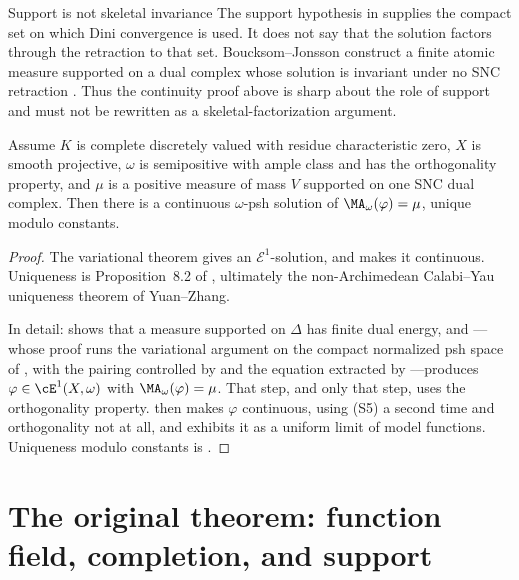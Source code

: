 \begin{warning}{Support is not skeletal invariance}
\label{warn:ch29-support-not-skeletal}
The support hypothesis in  supplies the
compact set on which Dini convergence is used.  It does not say that the
solution factors through the retraction to that set.  Boucksom--Jonsson
construct a finite atomic measure supported on a dual complex whose solution
is invariant under no SNC retraction \cite[Theorem~B]{BJGreen24}.  Thus the
continuity proof above is sharp about the role of support and must not be
rewritten as a skeletal-factorization argument.
\end{warning}

\begin{corollary}\label{cor:bfj-original-continuous-solution}
Assume \(K\) is complete discretely valued with residue characteristic zero,
\(X\) is smooth projective, \(\omega\) is semipositive with ample class and
has the orthogonality property, and \(\mu\) is a positive measure of mass
\(V\) supported on one SNC dual complex.  Then there is a continuous
\(\omega\)-psh solution of \(\MA_\omega(\varphi)=\mu\), unique modulo
constants.
\end{corollary}

\begin{proof}
The variational theorem gives an \(\mathcal E^1\)-solution, and
 makes it continuous.  Uniqueness
is Proposition~8.2 of \cite{BFJ15}, ultimately the non-Archimedean
Calabi--Yau uniqueness theorem of Yuan--Zhang.

In detail:  shows that a measure
supported on \(\Delta\) has finite dual energy, and
---whose proof runs the variational argument on
the compact normalized psh space of
, with the pairing controlled by
 and the equation extracted by
---produces
\(\varphi\in\cE^1(X,\omega)\) with \(\MA_\omega(\varphi)=\mu\).  That step,
and only that step, uses the orthogonality property.
 then makes \(\varphi\) continuous,
using \textup{(S5)} a second time and orthogonality not at all, and
 exhibits it as a uniform limit of model
functions.  Uniqueness modulo constants is .
\end{proof}

\section{The original theorem: function field, completion, and support}
\label{sec:ch29-original}

